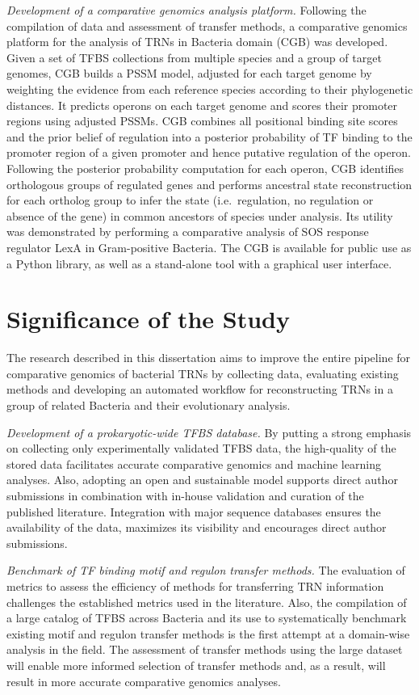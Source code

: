 \textit{Development of a comparative genomics analysis platform.} Following the
compilation of data and assessment of transfer methods, a comparative
genomics platform for the analysis of TRNs in Bacteria domain (CGB) was
developed. Given a set of TFBS collections from multiple species and a group of
target genomes, CGB builds a PSSM model, adjusted for each target genome by
weighting the evidence from each reference species according to their
phylogenetic distances. It predicts operons on each target genome and scores
their promoter regions using adjusted PSSMs. CGB combines all positional
binding site scores and the prior belief of regulation into a posterior
probability of TF binding to the promoter region of a given promoter and hence
putative regulation of the operon. Following the posterior probability
computation for each operon, CGB identifies orthologous groups of regulated
genes and performs
ancestral state reconstruction for each ortholog group to infer the state
(i.e.\ regulation, no regulation or absence of the gene) in common ancestors of
species under analysis. Its utility was demonstrated by performing a
comparative analysis of SOS response regulator LexA in Gram-positive
Bacteria. The CGB is available for public use as a Python library, as well as a
stand-alone tool with a graphical user interface.

\section{Significance of the Study}

The research described in this dissertation aims to improve the entire pipeline
for comparative genomics of bacterial TRNs by collecting data, evaluating
existing methods and developing an automated workflow for reconstructing TRNs
in a group of related Bacteria and their evolutionary analysis.

\textit{Development of a prokaryotic-wide TFBS database.}  By putting a strong
emphasis on collecting only experimentally validated TFBS data, the
high-quality of the stored data facilitates accurate comparative genomics and
machine learning analyses. Also, adopting an open and sustainable model
supports direct author submissions in combination with in-house validation and
curation of the published literature. Integration with major sequence databases
ensures the availability of the data, maximizes its visibility and encourages
direct author submissions.

\textit{Benchmark of TF binding motif and regulon transfer methods.} The
evaluation of metrics to assess the efficiency of methods for transferring TRN
information challenges the established metrics used in the literature. Also,
the compilation of a large catalog of TFBS across Bacteria and its use to
systematically benchmark existing motif and regulon transfer methods is the
first attempt at a domain-wise analysis in the field. The assessment of
transfer methods using the large dataset will enable more informed selection of
transfer methods and, as a result, will result in more accurate comparative
genomics analyses.

